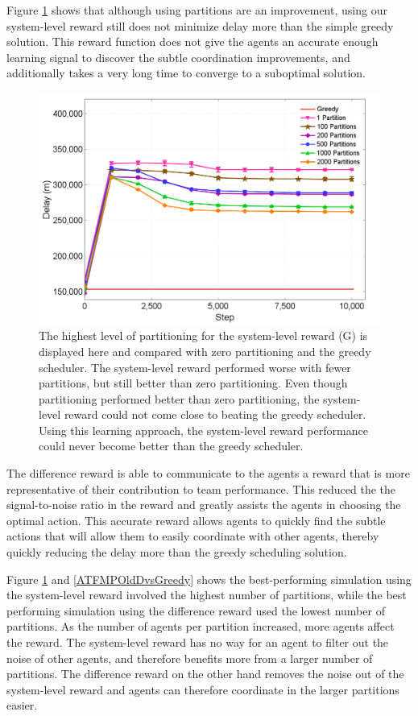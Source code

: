 \documentclass[onehalf,11pt]{beavtex}
\begin{document}
Figure \ref{ClusterRewardsGreedyG} shows that although using partitions are an improvement, using our system-level reward still does not minimize delay more than the simple greedy solution. This reward function does not give the agents an accurate enough learning signal to discover the subtle coordination improvements, and additionally takes a very long time to converge to a suboptimal solution. 

\begin{figure}[]
\centering
\includegraphics[width=1.0\columnwidth]{ClusterRewardsGreedyG}
\caption{The highest level of partitioning for the system-level reward (G) is displayed here and compared with zero partitioning and the greedy scheduler. The system-level reward performed worse with fewer partitions, but still better than zero partitioning. Even though partitioning performed better than zero partitioning, the system-level reward could not come close to beating the greedy scheduler. Using this learning approach, the system-level reward performance could never become better than the greedy scheduler.}
\label{ClusterRewardsGreedyG}
\end{figure}

The difference reward is able to communicate to the agents a reward that is more representative of their contribution to team performance. This reduced the the signal-to-noise ratio in the reward and greatly assists the agents in choosing the optimal action. This accurate reward allows agents to quickly find the subtle actions that will allow them to easily coordinate with other agents, thereby quickly reducing the delay more than the greedy scheduling solution. 

Figure \ref{ClusterRewardsGreedyG} and \ref{ATFMPOldDvsGreedy} shows the best-performing simulation using the system-level reward involved the highest number of partitions, while the best performing simulation using the difference reward used the lowest number of partitions. As the number of agents per partition increased, more agents affect the reward. The system-level reward has no way for an agent to filter out the noise of other agents, and therefore benefits more from a larger number of partitions. The difference reward on the other hand removes the noise out of the system-level reward and agents can therefore coordinate in the larger partitions easier.
\end{document}
